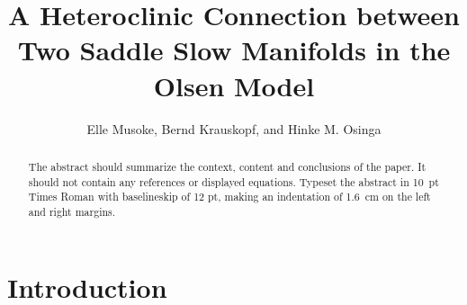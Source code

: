 \documentclass{ws-ijbc}
\begin{document}
\catchline{}{}{}{}{} %


\title{A Heteroclinic Connection between \\ Two Saddle Slow Manifolds in the Olsen Model}

\author{Elle Musoke, Bernd Krauskopf, and Hinke M. Osinga}


\address{Department of Mathematics, University of Auckland, Private Bag 92019\\
Auckland, 1142, New Zealand\\
elle.musoke@auckland.ac.nz}

\maketitle

\begin{history}
\end{history}

\begin{abstract}
The abstract should summarize the context, content and conclusions
of the paper. It should not contain any references or displayed
equations. Typeset the abstract in 10~pt Times Roman with
baselineskip of 12 pt, making an indentation of 1.6~cm on the left
and right margins.
\end{abstract}

\section{Introduction}
\end{document}
